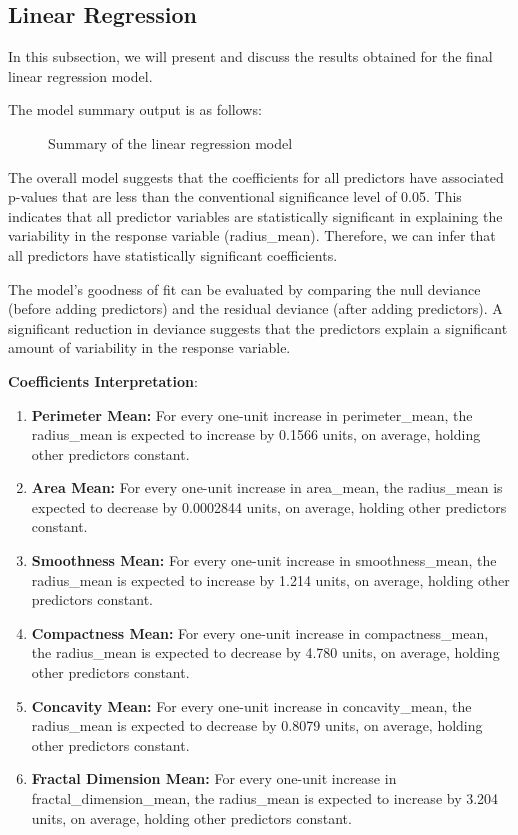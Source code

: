 \documentclass[conference]{IEEEtran}
\begin{document}
\subsection{Linear Regression}
In this subsection, we will present and discuss the results obtained for the final linear regression model.

The model summary output is as follows:

\begin{figure}[!h]
      \centering
       {}
      \caption{Summary of the linear regression model}
\end{figure}


The overall model suggests that the coefficients for all predictors have associated p-values that are less than the conventional significance level of 0.05. This indicates that all predictor variables are statistically significant in explaining the variability in the response variable (radius\_mean). Therefore, we can infer that all predictors have statistically significant coefficients.

The model's goodness of fit can be evaluated by comparing the null deviance (before adding predictors) and the residual deviance (after adding predictors). A significant reduction in deviance suggests that the predictors explain a significant amount of variability in the response variable.

\vspace{0.5cm}

\textbf{Coefficients Interpretation}:
\begin{enumerate}
\item \textbf{Perimeter Mean:} For every one-unit increase in perimeter\_mean, the radius\_mean is expected to increase by 0.1566 units, on average, holding other predictors constant.
\item \textbf{Area Mean:} For every one-unit increase in area\_mean, the radius\_mean is expected to decrease by 0.0002844 units, on average, holding other predictors constant.
\item \textbf{Smoothness Mean:} For every one-unit increase in smoothness\_mean, the radius\_mean is expected to increase by 1.214 units, on average, holding other predictors constant.
\item \textbf{Compactness Mean:} For every one-unit increase in compactness\_mean, the radius\_mean is expected to decrease by 4.780 units, on average, holding other predictors constant.
\item \textbf{Concavity Mean:} For every one-unit increase in concavity\_mean, the radius\_mean is expected to decrease by 0.8079 units, on average, holding other predictors constant.
\item \textbf{Fractal Dimension Mean:} For every one-unit increase in fractal\_dimension\_mean, the radius\_mean is expected to increase by 3.204 units, on average, holding other predictors constant.
\end{enumerate}
\end{document}

